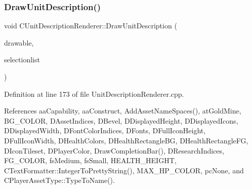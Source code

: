 \hypertarget{classCUnitDescriptionRenderer_a129cfc5d3942ebc37b9ca51530bf4daa}{}\label{classCUnitDescriptionRenderer_a129cfc5d3942ebc37b9ca51530bf4daa} 
\subsubsection{\texorpdfstring{Draw\+Unit\+Description()}{DrawUnitDescription()}}
{\footnotesize\ttfamily void C\+Unit\+Description\+Renderer\+::\+Draw\+Unit\+Description (\begin{DoxyParamCaption}\item[{Gdk\+Drawable $\ast$}]{drawable,  }\item[{const std\+::list$<$ std\+::weak\+\_\+ptr$<$ \hyperlink{classCPlayerAsset}{C\+Player\+Asset} $>$ $>$ \&}]{selectionlist }\end{DoxyParamCaption})}



Definition at line 173 of file Unit\+Description\+Renderer.\+cpp.



References aa\+Capability, aa\+Construct, Add\+Asset\+Name\+Spaces(), at\+Gold\+Mine, B\+G\+\_\+\+C\+O\+L\+OR, D\+Asset\+Indices, D\+Bevel, D\+Displayed\+Height, D\+Displayed\+Icons, D\+Displayed\+Width, D\+Font\+Color\+Indices, D\+Fonts, D\+Full\+Icon\+Height, D\+Full\+Icon\+Width, D\+Health\+Colors, D\+Health\+Rectangle\+BG, D\+Health\+Rectangle\+FG, D\+Icon\+Tileset, D\+Player\+Color, Draw\+Completion\+Bar(), D\+Research\+Indices, F\+G\+\_\+\+C\+O\+L\+OR, fs\+Medium, fs\+Small, H\+E\+A\+L\+T\+H\+\_\+\+H\+E\+I\+G\+HT, C\+Text\+Formatter\+::\+Integer\+To\+Pretty\+String(), M\+A\+X\+\_\+\+H\+P\+\_\+\+C\+O\+L\+OR, pc\+None, and C\+Player\+Asset\+Type\+::\+Type\+To\+Name().



